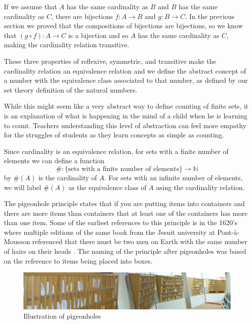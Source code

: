 \documentclass[
]{book}
\theoremstyle{definition}
\theoremstyle{definition}
\theoremstyle{definition}
\theoremstyle{definition}
\theoremstyle{remark}
\begin{document}
If we assume that \(A\) has the same cardinality as \(B\) and \(B\) has the same cardinality as \(C\), there are bijections \(f:A\rightarrow B\) and \(g:B\rightarrow C\). In the previous section we proved that the compositions of bijections are bijections, so we know that \((g\circ f):A\rightarrow C\) is a bijection and so \(A\) has the same cardinality as \(C\), making the cardinality relation transitive.

These three properties of reflexive, symmetric, and transitive make the cardinality relation an equivalence relation and we define the abstract concept of a number with the equivalence class associated to that number, as defined by our set theory definition of the natural numbers.

While this might seem like a very abstract way to define counting of finite sets, it is an explanation of what is happening in the mind of a child when he is learning to count. Teachers understanding this level of abstraction can feel more empathy for the struggles of students as they learn concepts as simple as counting.

Since cardinality is an equivalence relation, for sets with a finite number of elements we can define a function \[\#: \mbox{\{sets with a finite number of elements\}}\rightarrow \mathbb{N}\] by \(\#(A)\) is the cardinality of \(A\). For sets with an infinite number of elements, we will label \(\#(A)\) as the equivalence class of \(A\) using the cardinality relation.

The pigeonhole principle states that if you are putting items into containers and there are more items than containers that at least one of the containers has more than one item. Some of the earliest references to this principle is in the 1620's where multiple editions of the same book from the Jesuit university at Pont-à-Mousson referenced that there must be two men on Earth with the same number of hairs on their heads \citep{Leurechon}. The naming of the principle after pigeonholes was based on the reference to items being placed into boxes.

\begin{figure}

{\centering \includegraphics[width=1\linewidth]{images/Pigeon-hole-messagebox-4} 

}

\caption{Illustration of pigeonholes}\label{fig:pigeon2}
\end{figure}
\end{document}

